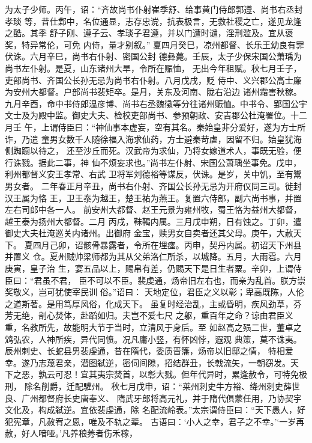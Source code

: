 \documentclass[12pt,UTF8]{ctexbook}
\begin{document}
为太子少师。丙午，诏：“齐故尚书仆射崔季舒、给事黄门侍郎郭遵、尚书右丞封孝琰
等，昔仕鄴中，名位通显，志存忠谠，抗表极言，无救社稷之亡，遂见龙逢之酷。其季
舒子刚、遵子云、孝琰子君遵，并以门遭时谴，淫刑滥及。宜从褒奖，特异常伦，可免
内侍，量才别叙。”
夏四月癸巳，凉州都督、长乐王幼良有罪伏诛。六月辛巳，尚书右仆射、密国公封
德彝薨。壬辰，太子少保宋国公萧瑀为尚书左仆射。是夏，山东诸州大旱，令所在赈恤，
无出今年租赋。秋七月壬子，吏部尚书、齐国公长孙无忌为尚书右仆射。八月戊戌，贬
侍中、义兴郡公高士廉为安州大都督。户部尚书裴矩卒。是月，关东及河南、陇右沿边
诸州霜害秋稼。
九月辛酉，命中书侍郎温彦博、尚书右丞魏徵等分往诸州赈恤。中书令、郢国公宇
文士及为殿中监。御史大夫、检校吏部尚书、参预朝政、安吉郡公杜淹署位。十二月壬
午，上谓侍臣曰：“神仙事本虚妄，空有其名。秦始皇非分爱好，遂为方士所诈，乃遣
童男女数千人随徐福入海求仙药，方士避秦苛虐，因留不归。始皇犹海侧踟蹰以待之，
还至沙丘而死。汉武帝为求仙，乃将女嫁道术人，事既无验，便行诛戮。据此二事，神
仙不烦妄求也。”尚书左仆射、宋国公萧瑀坐事免。戊申，利州都督义安王孝常、右武
卫将军刘德裕等谋反，伏诛。是岁，关中饥，至有鬻男女者。
二年春正月辛丑，尚书右仆射、齐国公长孙无忌为开府仪同三司。徙封汉王属为恪
王，卫王泰为越王，楚王祐为燕王。复置六侍郎，副六尚书事，并置左右司郎中各一人。
前安州大都督、赵王元景为雍州牧，蜀王恪为益州大都督，越王泰为扬州大都督。二月
丙戌，靺鞨内属。三月戊申朔，日有蚀之。丁卯，遣御史大夫杜淹巡关内诸州。出御府
金宝，赎男女自卖者还其父母。庚午，大赦天下。
夏四月己卯，诏骸骨暴露者，令所在埋瘗。丙申，契丹内属。初诏天下州县并置义
仓。夏州贼帅梁师都为其从父弟洛仁所杀，以城降。五月，大雨雹。六月庚寅，皇子治
生，宴五品以上，赐帛有差，仍赐天下是日生者粟。辛卯，上谓侍臣曰：“君虽不君，
臣不可以不臣。裴虔通，炀帝旧左右也，而亲为乱首。朕方崇奖敬义，岂可犹使宰民训
俗。”诏曰：
天地定位，君臣之义以彰；卑高既陈，人伦之道斯著。是用笃厚风俗，化成天下。
虽复时经治乱，主或昏明，疾风劲草，芬芳无绝，剖心焚体，赴蹈如归。夫岂不爱七尺
之躯，重百年之命？谅由君臣义重，名教所先，故能明大节于当时，立清风于身后。至
如赵高之殒二世，董卓之鸩弘农，人神所疾，异代同愤。况凡庸小竖，有怀凶悖，遐观
典策，莫不诛夷。辰州刺史、长蛇县男裴虔通，昔在隋代，委质晋籓，炀帝以旧邸之情，
特相爱幸。遂乃志蔑君亲，潜图弑逆，密伺间隙，招结群丑，长戟流矢，一朝窃发。天
下之恶，孰云可忍！宜其夷宗焚首，以彰大戮。但年代异时，累逢赦令，可特免极刑，
除名削爵，迁配驩州。
秋七月戊申，诏：“莱州刺史牛方裕、绛州刺史薛世良、广州都督府长史唐奉义、
隋武牙郎将高元礼，并于隋代俱蒙任用，乃协契宇文化及，构成弑逆。宜依裴虔通，除
名配流岭表。”太宗谓侍臣曰：“天下愚人，好犯宪章，凡赦宥之恩，唯及不轨之辈。
古语曰：‘小人之幸，君子之不幸。’‘一岁再赦，好人喑哑。’凡养稂莠者伤禾稼，
\end{document}
